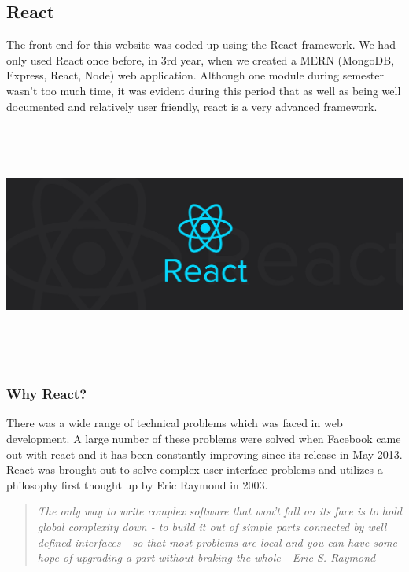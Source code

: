 \subsection{React}
The front end for this website was coded up using the React framework. We had only used React once before, in 3rd year, when we created a MERN (MongoDB, Express, React, Node) web application. Although one module during semester wasn't too much time, it was evident during this period that as well as being well documented and relatively user friendly, react is a very advanced framework.
\begin{center}
    \includegraphics[width = 16cm, height = 8cm]{img/reactImage.jpeg}
\end{center}
    
\subsubsection{Why React?}
There was a wide range of technical problems which was faced in web development. \cite{IntroductionReact}A large number of these problems were solved when Facebook came out with react and it has been constantly improving since its release in May 2013. React was brought out to solve complex user interface problems and utilizes a philosophy first thought up by Eric Raymond in 2003.

\begin{quote}
\cite{ArtOfUnix}\emph{The only way to write complex software that won't fall on its face is to hold global complexity down - to build it out of simple parts connected by well defined interfaces - so that most problems are local and you can have some hope of upgrading a part without braking the whole - Eric S. Raymond}
\end{quote}


